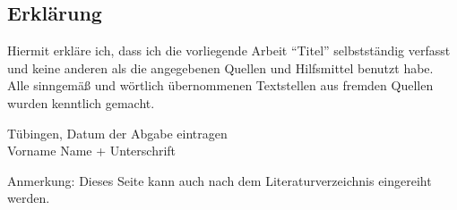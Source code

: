 
\thispagestyle{empty}
\subsection*{Erklärung}
{\RaggedRight
Hiermit erkläre ich, dass ich die vorliegende Arbeit 
\enquote{Titel}
selbstständig verfasst und keine anderen als die angegebenen Quellen und Hilfsmittel benutzt habe.
Alle sinngemäß und wörtlich übernommenen Textstellen aus fremden Quellen wurden kenntlich gemacht.}
\vspace{5em}

Tübingen, Datum der Abgabe eintragen		\\[2em]
Vorname Name + Unterschrift

Anmerkung: Dieses Seite kann auch nach dem Literaturverzeichnis eingereiht werden.

\cleardoubleoddpage

